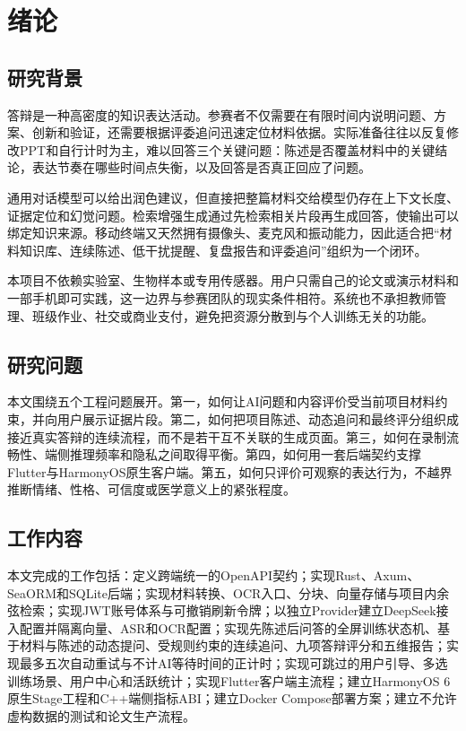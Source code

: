 \chapter{绪论}
\section{研究背景}
答辩是一种高密度的知识表达活动。参赛者不仅需要在有限时间内说明问题、方案、创新和验证，还需要根据评委追问迅速定位材料依据。实际准备往往以反复修改PPT和自行计时为主，难以回答三个关键问题：陈述是否覆盖材料中的关键结论，表达节奏在哪些时间点失衡，以及回答是否真正回应了问题。

通用对话模型可以给出润色建议，但直接把整篇材料交给模型仍存在上下文长度、证据定位和幻觉问题。检索增强生成通过先检索相关片段再生成回答，使输出可以绑定知识来源\cite{lewis2020rag}。移动终端又天然拥有摄像头、麦克风和振动能力，因此适合把“材料知识库、连续陈述、低干扰提醒、复盘报告和评委追问”组织为一个闭环。

本项目不依赖实验室、生物样本或专用传感器。用户只需自己的论文或演示材料和一部手机即可实践，这一边界与参赛团队的现实条件相符。系统也不承担教师管理、班级作业、社交或商业支付，避免把资源分散到与个人训练无关的功能。

\section{研究问题}
本文围绕五个工程问题展开。第一，如何让AI问题和内容评价受当前项目材料约束，并向用户展示证据片段。第二，如何把项目陈述、动态追问和最终评分组织成接近真实答辩的连续流程，而不是若干互不关联的生成页面。第三，如何在录制流畅性、端侧推理频率和隐私之间取得平衡。第四，如何用一套后端契约支撑Flutter与HarmonyOS原生客户端。第五，如何只评价可观察的表达行为，不越界推断情绪、性格、可信度或医学意义上的紧张程度。

\section{工作内容}
本文完成的工作包括：定义跨端统一的OpenAPI契约；实现Rust、Axum、SeaORM和SQLite后端；实现材料转换、OCR入口、分块、向量存储与项目内余弦检索；实现JWT账号体系与可撤销刷新令牌；以独立Provider建立DeepSeek接入配置并隔离向量、ASR和OCR配置；实现先陈述后问答的全屏训练状态机、基于材料与陈述的动态提问、受规则约束的连续追问、九项答辩评分和五维报告；实现最多五次自动重试与不计AI等待时间的正计时；实现可跳过的用户引导、多选训练场景、用户中心和活跃统计；实现Flutter客户端主流程；建立HarmonyOS 6原生Stage工程和C++端侧指标ABI；建立Docker Compose部署方案；建立不允许虚构数据的测试和论文生产流程。

